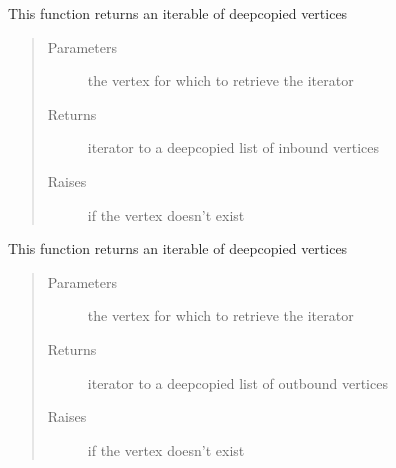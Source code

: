 \documentclass[letterpaper,10pt,english]{sphinxmanual}
\begin{document}
\begin{fulllineitems}
\begin{fulllineitems}
\label{\detokenize{Graph:Graph.Graph.parse_inbound_edges}}
This function returns an iterable of deepcopied vertices
\begin{quote}\begin{description}
\item[{Parameters}] \leavevmode
{} \textendash{} the vertex for which to retrieve the iterator

\item[{Returns}] \leavevmode
iterator to a deepcopied list of inbound vertices

\item[{Raises}] \leavevmode
{} \textendash{} if the vertex doesn’t exist

\end{description}\end{quote}

\end{fulllineitems}


\begin{fulllineitems}
\label{\detokenize{Graph:Graph.Graph.parse_outbound_edges}}
This function returns an iterable of deepcopied vertices
\begin{quote}\begin{description}
\item[{Parameters}] \leavevmode
{} \textendash{} the vertex for which to retrieve the iterator

\item[{Returns}] \leavevmode
iterator to a deepcopied list of outbound vertices

\item[{Raises}] \leavevmode
{} \textendash{} if the vertex doesn’t exist

\end{description}\end{quote}

\end{fulllineitems}


\end{fulllineitems}
\end{document}
